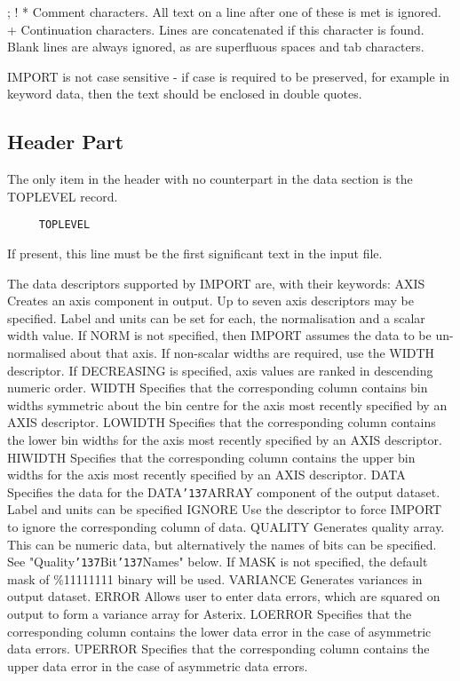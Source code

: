 \documentclass{book}
\renewcommand{\_}{{\tt\char'137}}     %
\begin{document}
; ! * Comment characters. All text on a line after one of
these is met is ignored.
~ + Continuation characters. Lines are concatenated if
this character is found.
Blank lines are always ignored, as are superfluous spaces and
tab characters.
 
IMPORT is not case sensitive - if case is required to be
preserved, for example in keyword data, then the text should
be enclosed in double quotes.
 
\subsection{Header Part}
The only item in the header with no counterpart in the
data section is the TOPLEVEL record.
 
\begin{verbatim}
     TOPLEVEL  
 \end{verbatim}
If present, this line must be the first significant text
in the input file.
 
The data descriptors supported by IMPORT are, with their
keywords:
AXIS     
Creates an axis component in output. Up to seven
axis descriptors may be specified. Label and units
can be set for each, the normalisation and a scalar
width value. If NORM is not specified, then IMPORT
assumes the data to be un-normalised about that axis.
If non-scalar widths are required, use the WIDTH
descriptor. If DECREASING is specified, axis values
are ranked in descending numeric order.
WIDTH Specifies that the corresponding column contains
bin widths symmetric about the bin centre for the
axis most recently specified by an AXIS descriptor.
LOWIDTH Specifies that the corresponding column contains the
lower bin widths for the axis most recently specified
by an AXIS descriptor.
HIWIDTH Specifies that the corresponding column contains the
upper bin widths for the axis most recently specified
by an AXIS descriptor.
DATA  
Specifies the data for the DATA\_ARRAY component of
the output dataset. Label and units can be specified
IGNORE Use the descriptor to force IMPORT to ignore the
corresponding column of data.
QUALITY 
Generates quality array. This can be numeric data,
but alternatively the names of bits can be specified.
See "Quality\_Bit\_Names" below. If MASK is not
specified, the default mask of \%11111111 binary will
be used.
VARIANCE Generates variances in output dataset.
ERROR Allows user to enter data errors, which are squared
on output to form a variance array for Asterix.
LOERROR Specifies that the corresponding column contains the
lower data error in the case of asymmetric data errors.
UPERROR Specifies that the corresponding column contains the
upper data error in the case of asymmetric data errors.
\end{document}
